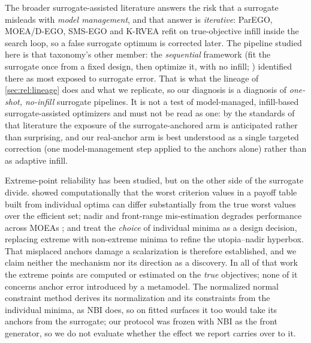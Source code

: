 The broader surrogate-assisted literature \citep{jin2011surrogate,tabatabaei2015survey,chugh2019survey,deb2019taxonomy}
answers the risk that a surrogate misleads with \emph{model management}, and that answer is \emph{iterative}: ParEGO,
MOEA/D-EGO, SMS-EGO and K-RVEA \citep{knowles2006parego,zhang2010moeadego,ponweiser2008smsego,chugh2018krvea} refit on
true-objective infill inside the search loop, so a false surrogate optimum is corrected later. The pipeline studied
here is that taxonomy's other member: the \emph{sequential} framework (fit the
surrogate once from a fixed design, then optimize it, with no infill; \citealp{tabatabaei2015survey}) identified there as most exposed to surrogate
error. That is what the lineage of
\cref{sec:rel:lineage} does and what we replicate, so our diagnosis is a diagnosis of \emph{one-shot, no-infill}
surrogate pipelines. It is not a test of model-managed, infill-based surrogate-assisted
optimizers and must not be read as one: by the standards of that literature the exposure of the surrogate-anchored arm
is anticipated rather than surprising, and our real-anchor arm is best understood as a single targeted correction
(one model-management step applied to the anchors alone) rather than as adaptive infill.

Extreme-point reliability has been studied, but on the other side of the surrogate divide.
\citet{isermann1988payoff} showed computationally that the worst criterion values in a payoff table built from
individual optima can differ substantially from the true worst values over the efficient set; nadir and front-range
mis-estimation
degrades performance across MOEAs \citep{deb2010nadir,he2021normalization}; and \citet{herrmann2026nonextreme} treat
the \emph{choice} of individual minima as a design decision, replacing extreme with non-extreme minima to refine the
utopia--nadir hyperbox.
That misplaced anchors damage a scalarization is therefore established, and we claim neither
the mechanism nor its direction as a discovery. In all of that work the extreme points are computed or estimated on the
\emph{true} objectives; none of it concerns anchor error introduced by a metamodel. The normalized normal constraint
method \citep{messac2003normalized} derives its normalization and its constraints from the individual minima, as NBI
does, so on fitted surfaces it too would take its anchors from the surrogate; our protocol was frozen with NBI as the
front generator, so we do not evaluate whether the effect we report carries over to it.

